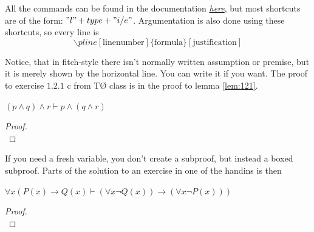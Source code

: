 \documentclass[a4, english]{article}
\begin{document}
All the commands can be found in the documentation
\href{http://mirrors.dotsrc.org/ctan/macros/latex/contrib/lplfitch/lplfitch.pdf}{\emph{here}},
but most shortcuts are of the form: $"l" + type + "i/e"$. Argumentation is also
done using these shortcuts, so every line is
\begin{equation*}
    \backslash pline[\text{linenumber}]\{\text{formula}\}[\text{justification}]
\end{equation*}

Notice, that in fitch-style there isn't normally written assumption or premise,
but it is merely shown by the horizontal line. You can write it if you want. The
proof to exercise $1.2.1$ c from TØ class is in the proof to lemma
\ref{lem:121}.
\begin{lemma} \label{lem:121}
    $(p \wedge q) \wedge r \vdash p \wedge (q \wedge r)$
\end{lemma}
\begin{proof}
     \\ %
\end{proof}

If you need a fresh variable, you don't create a subproof, but instead a boxed
subproof. Parts of the solution to an exercise in one of the handins is then
\begin{theorem} \label{thm:handin}
    $\forall x (P(x) \rightarrow Q(x) \vdash (\forall x \neg Q(x)) \rightarrow (\forall x \neg P(x)))$
\end{theorem}
\begin{proof}
     \\ %
\end{proof}
\end{document}
